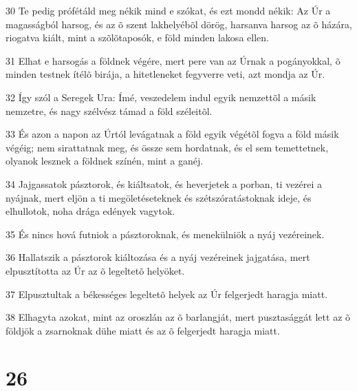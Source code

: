 \par 30 Te pedig prófétáld meg nékik mind e szókat, és ezt mondd nékik: Az Úr a magasságból harsog, és az õ szent lakhelyébõl dörög, harsanva harsog az õ házára, riogatva kiált, mint a szõlõtaposók, e föld minden lakosa ellen.
\par 31 Elhat e harsogás a földnek végére, mert pere van az Úrnak a pogányokkal, õ minden testnek ítélõ birája, a hitetleneket fegyverre veti, azt mondja  az Úr.
\par 32 Így szól a Seregek Ura: Ímé, veszedelem indul egyik nemzettõl a másik nemzetre, és nagy szélvész támad a föld széleitõl.
\par 33 És azon a napon az Úrtól levágatnak a föld egyik végétõl fogva a föld másik végéig; nem sirattatnak meg, és össze sem hordatnak, és el sem temettetnek, olyanok lesznek a földnek színén, mint a ganéj.
\par 34 Jajgassatok pásztorok, és kiáltsatok, és heverjetek a porban, ti vezérei a nyájnak, mert eljön a ti megöletéseteknek és szétszóratástoknak ideje, és elhullotok, noha drága edények vagytok.
\par 35 És nincs hová futniok a pásztoroknak, és menekülniök a nyáj vezéreinek.
\par 36 Hallatszik a pásztorok kiáltozása és a nyáj vezéreinek jajgatása, mert elpusztította az Úr az õ legeltetõ helyöket.
\par 37 Elpusztultak a békességes legeltetõ helyek az Úr felgerjedt haragja miatt.
\par 38 Elhagyta azokat, mint az oroszlán az õ barlangját, mert pusztasággát lett az õ földjök a zsarnoknak dühe miatt és az õ felgerjedt haragja miatt.

\chapter{26}

